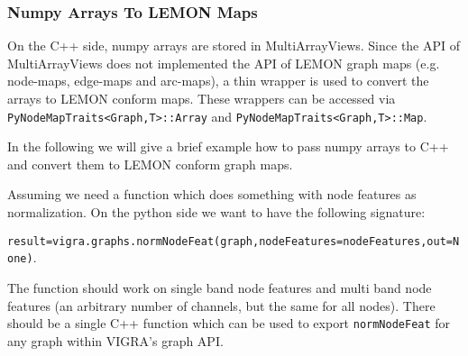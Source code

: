 \subsubsection{Numpy Arrays To LEMON Maps}


On the C++ side, numpy arrays are stored in MultiArrayViews.
Since the API of MultiArrayViews \cite{software_vigra_multiarray_api} does
not implemented the API  of LEMON graph maps (e.g. node-maps, edge-maps and arc-maps), 
a thin wrapper is used to convert the arrays to LEMON conform maps.
These wrappers can be accessed via \lstinline{PyNodeMapTraits<Graph,T>::Array} and 
\lstinline{PyNodeMapTraits<Graph,T>::Map}. 


In the following we will give a brief example how to pass numpy arrays to C++
and convert them to LEMON conform graph maps.

Assuming we need a function which does something with node features as normalization.
On the python side we want to have the following signature:

\lstinline{result=vigra.graphs.normNodeFeat(graph,nodeFeatures=nodeFeatures,out=None)}.

The function should work on single band node features and multi band node features
(an arbitrary number of channels, but the same for all nodes).
There should be a single C++ function which can be used to export
\lstinline{normNodeFeat} for any graph within VIGRA's graph API. 




